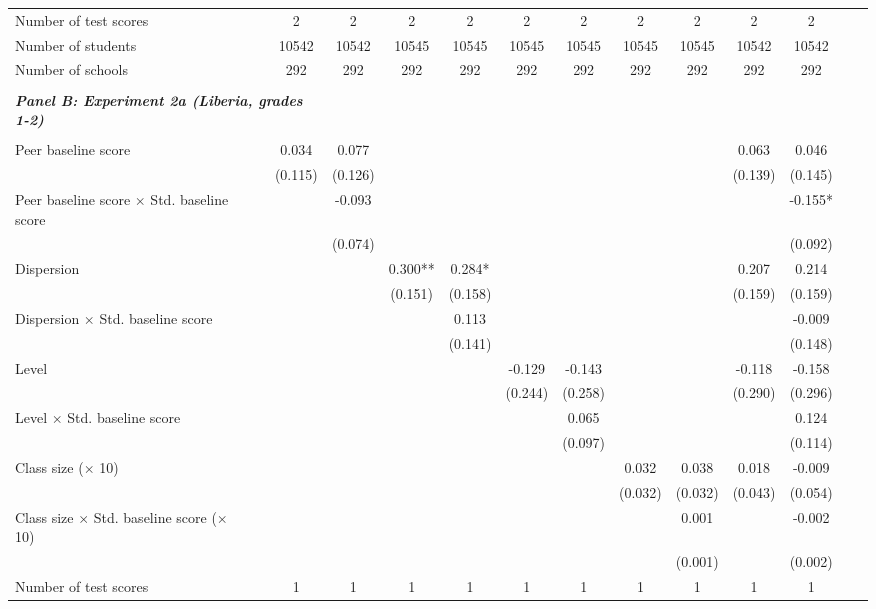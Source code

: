 \begin{center}
\begin{tiny}
\begin{threeparttable}
\begin{tabular} {@{} l l c c c c c c c c c c c c @{}}
Number of test scores &  & 2 & 2 & 2 & 2 & 2 & 2 & 2 & 2 & 2 & 2 \\
Number of students &  & 10542 & 10542 & 10545 & 10545 & 10545 & 10545 & 10545 & 10545 & 10542 & 10542 \\
Number of schools &  & 292 & 292 & 292 & 292 & 292 & 292 & 292 & 292 & 292 & 292 \\
 \midrule
\\
\multicolumn{3}{l}{\textbf{\textit{Panel B: Experiment 2a (Liberia, grades 1-2)}}} \\
\\
Peer baseline score &  & 0.034 & 0.077 &  &  &  &  &  &  & 0.063 & 0.046 \\
                 &  & (0.115) & (0.126) &  &  &  &  &  &  & (0.139) & (0.145) \\
Peer baseline score $\times$ Std. baseline score &  &  & -0.093 &  &  &  &  &  &  &  & -0.155* \\
                 &  &  & (0.074) &  &  &  &  &  &  &  & (0.092) \\
Dispersion &  &  &  & 0.300** & 0.284* &  &  &  &  & 0.207 & 0.214 \\
                 &  &  &  & (0.151) & (0.158) &  &  &  &  & (0.159) & (0.159) \\
Dispersion $\times$ Std. baseline score &  &  &  &  & 0.113 &  &  &  &  &  & -0.009 \\
                 &  &  &  &  & (0.141) &  &  &  &  &  & (0.148) \\
Level &  &  &  &  &  & -0.129 & -0.143 &  &  & -0.118 & -0.158 \\
                 &  &  &  &  &  & (0.244) & (0.258) &  &  & (0.290) & (0.296) \\
Level $\times$ Std. baseline score &  &  &  &  &  &  & 0.065 &  &  &  & 0.124 \\
                 &  &  &  &  &  &  & (0.097) &  &  &  & (0.114) \\
Class size ($\times$ 10) &  &  &  &  &  &  &  & 0.032 & 0.038 & 0.018 & -0.009 \\
                 &  &  &  &  &  &  &  & (0.032) & (0.032) & (0.043) & (0.054) \\
Class size $\times$ Std. baseline score ($\times$ 10) &  &  &  &  &  &  &  &  & 0.001 &  & -0.002 \\
                 &  &  &  &  &  &  &  &  & (0.001) &  & (0.002) \\
\midrule
Number of test scores &  & 1 & 1 & 1 & 1 & 1 & 1 & 1 & 1 & 1 & 1 \\

\end{tabular}
\end{threeparttable}
\end{tiny}
\end{center}
